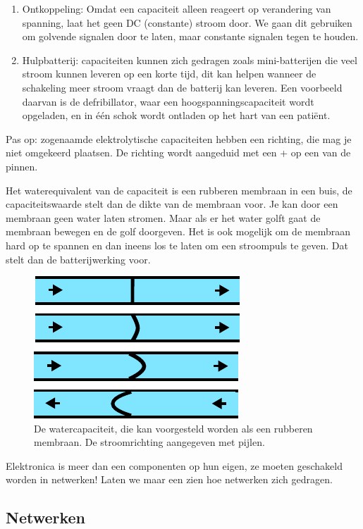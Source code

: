 \documentclass{article}
\begin{document}
		\begin{enumerate}
			\item Ontkoppeling: Omdat een capaciteit alleen reageert op verandering van spanning, laat het geen DC (constante) stroom door. We gaan dit gebruiken om golvende signalen door te laten, maar constante signalen tegen te houden.
			\item Hulpbatterij: capaciteiten kunnen zich gedragen zoals mini-batterijen die veel stroom kunnen leveren op een korte tijd, dit kan helpen wanneer de schakeling meer stroom vraagt dan de batterij kan leveren. Een voorbeeld daarvan is de defribillator, waar een hoogspanningscapaciteit wordt opgeladen, en in \'e\'en schok wordt ontladen op het hart van een pati\"ent.
		\end{enumerate}
		Pas op: zogenaamde elektrolytische capaciteiten hebben een richting, die mag je niet omgekeerd plaatsen. De richting wordt aangeduid met een + op een van de pinnen.

		Het waterequivalent van de capaciteit is een rubberen membraan in een buis, de capaciteitswaarde stelt dan de dikte van de membraan voor. Je kan door een membraan geen water laten stromen. Maar als er het water golft gaat de membraan bewegen en de golf doorgeven. Het is ook mogelijk om de membraan hard op te spannen en dan ineens los te laten om een stroompuls te geven. Dat stelt dan de batterijwerking voor.
		\begin{figure}[htbp]
				\centering
				\includegraphics{watercap}
				\caption{De watercapaciteit, die kan voorgesteld worden als een rubberen membraan. De stroomrichting aangegeven met pijlen.}
				\label{fig:watercap}
			\end{figure}

		Elektronica is meer dan een componenten op hun eigen, ze moeten geschakeld worden in netwerken! Laten we maar een zien hoe netwerken zich gedragen.

		\subsection{Netwerken}
\end{document}
